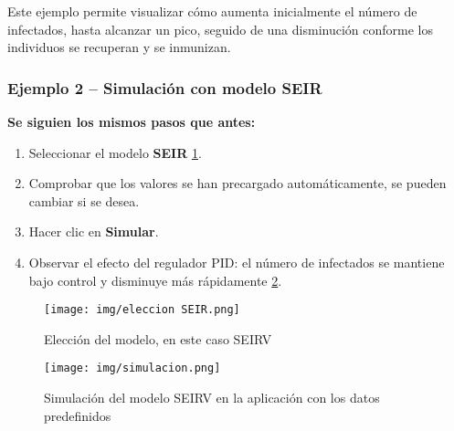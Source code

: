 Este ejemplo permite visualizar cómo aumenta inicialmente el número de infectados, hasta alcanzar un pico, seguido de una disminución conforme los individuos se recuperan y se inmunizan.

\vspace{1em}
\subsubsection{Ejemplo 2 – Simulación con modelo SEIR}

\textbf{Se siguien los mismos pasos que antes:}
\begin{enumerate}
    \item Seleccionar el modelo \textbf{SEIR} \ref{fig:eleccion seirv}.
    \item Comprobar que los valores se han precargado automáticamente, se pueden cambiar si se desea.
    \item Hacer clic en \textbf{Simular}.
    \item Observar el efecto del regulador PID: el número de infectados se mantiene bajo control y disminuye más rápidamente \ref{fig:eseeir}.
\end{enumerate}

\begin{figure}[H]
        \centering
        \texttt{[image: img/eleccion SEIR.png]}
        \caption{Elección del modelo, en este caso SEIRV}
        \label{fig:eleccion seirv}
        \vspace{0.5cm} %
    \end{figure}


\begin{figure}[H]
        \centering
        \texttt{[image: img/simulacion.png]}
        \caption{Simulación del modelo SEIRV en la aplicación con los datos predefinidos}
        \label{fig:eseeir}
        \vspace{0.5cm} %
    \end{figure}









